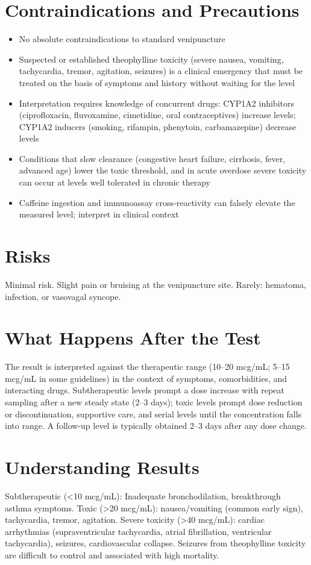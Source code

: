 \section*{Contraindications and Precautions}
\begin{itemize}
  \item No absolute contraindications to standard venipuncture
  \item Suspected or established theophylline toxicity (severe nausea, vomiting, tachycardia, tremor, agitation, seizures) is a clinical emergency that must be treated on the basis of symptoms and history without waiting for the level
  \item Interpretation requires knowledge of concurrent drugs: CYP1A2 inhibitors (ciprofloxacin, fluvoxamine, cimetidine, oral contraceptives) increase levels; CYP1A2 inducers (smoking, rifampin, phenytoin, carbamazepine) decrease levels
  \item Conditions that slow clearance (congestive heart failure, cirrhosis, fever, advanced age) lower the toxic threshold, and in acute overdose severe toxicity can occur at levels well tolerated in chronic therapy
  \item Caffeine ingestion and immunoassay cross-reactivity can falsely elevate the measured level; interpret in clinical context
\end{itemize}
\section*{Risks}
Minimal risk. Slight pain or bruising at the venipuncture site. Rarely: hematoma, infection, or vasovagal syncope.
\section*{What Happens After the Test}
The result is interpreted against the therapeutic range (10--20 mcg/mL; 5--15 mcg/mL in some guidelines) in the context of symptoms, comorbidities, and interacting drugs. Subtherapeutic levels prompt a dose increase with repeat sampling after a new steady state (2--3 days); toxic levels prompt dose reduction or discontinuation, supportive care, and serial levels until the concentration falls into range. A follow-up level is typically obtained 2--3 days after any dose change.
\section*{Understanding Results}
Subtherapeutic (<10 mcg/mL): Inadequate bronchodilation, breakthrough asthma symptoms. Toxic (>20 mcg/mL): nausea/vomiting (common early sign), tachycardia, tremor, agitation. Severe toxicity (>40 mcg/mL): cardiac arrhythmias (supraventricular tachycardia, atrial fibrillation, ventricular tachycardia), seizures, cardiovascular collapse. Seizures from theophylline toxicity are difficult to control and associated with high mortality.
